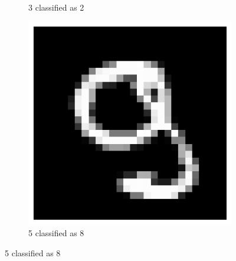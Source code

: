 \documentclass{article}
\begin{document}
\begin{figure}[H]
\begin{subfigure}[b]{0.3\textwidth}
        \caption{3 classified as 2}
        \label{fig:digit2}
    \end{subfigure}
    \hfill
    \begin{subfigure}[b]{0.3\textwidth}
        \centering
        \includegraphics[width=\textwidth]{digit3.png}
        \caption{5 classified as 8}
        \label{fig:digit3}
    \end{subfigure}
    
    \vspace{1cm}
    

\end{figure}
\end{document}
